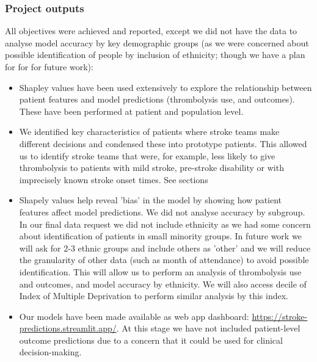 \subsubsection*{Project outputs}

All objectives were achieved and reported, except we did not have the data to analyse model accuracy by key demographic groups (as we were concerned about possible identification of people by inclusion of ethnicity; though we have a plan for for for future work):

\begin{itemize}
    \item Shapley values have been used extensively to explore the relationship between patient features and model predictions (thrombolysis use, and outcomes). These have been performed at patient and population level. %
    \item We identified key characteristics of patients where stroke teams make different decisions and condensed these into prototype patients. This allowed us to identify stroke teams that were, for example, less likely to give thrombolysis to patients with mild stroke, pre-stroke disability or with imprecisely known stroke onset times. See sections %
    \item Shapely values help reveal 'bias' in the model by showing how patient features affect model predictions. We did not analyse accuracy by subgroup. In our final data request we did not include ethnicity as we had some concern about identification of patients in small minority groups. In future work we will ask for 2-3 ethnic groups and include others as 'other' and we will reduce the granularity of other data (such as month of attendance) to avoid possible identification. This will allow us to perform an analysis of thrombolysis use and outcomes, and model accuracy by ethnicity. We will also access decile of Index of Multiple Deprivation to perform similar analysis by this index.
    \item Our models have been made available as web app dashboard: \url{https://stroke-predictions.streamlit.app/}. At this stage we have not included patient-level outcome predictions due to a concern that it could be used for clinical decision-making. 
\end{itemize}




